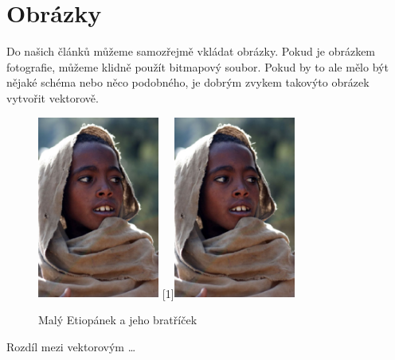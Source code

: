 \documentclass[11pt,a4paper]{article}
\begin{document}
\section{Obrázky}
Do našich článků můžeme samozřejmě vkládat obrázky. Pokud je obrázkem fotografie, můžeme klidně použít bitmapový soubor. Pokud by to ale mělo být nějaké schéma nebo něco podobného, je dobrým zvykem takovýto obrázek vytvořit vektorově.
\begin{figure}[h]
\begin{center}
    \includegraphics[width=4cm]{etiopan}
    \scalebox{-1}[1]{\includegraphics[width=4cm]{etiopan}}
    \caption{Malý Etiopánek a jeho bratříček} 
    \label{fig:img1}
\end{center}
\end{figure}
\newpage
Rozdíl mezi vektorovým \dots
\end{document}
